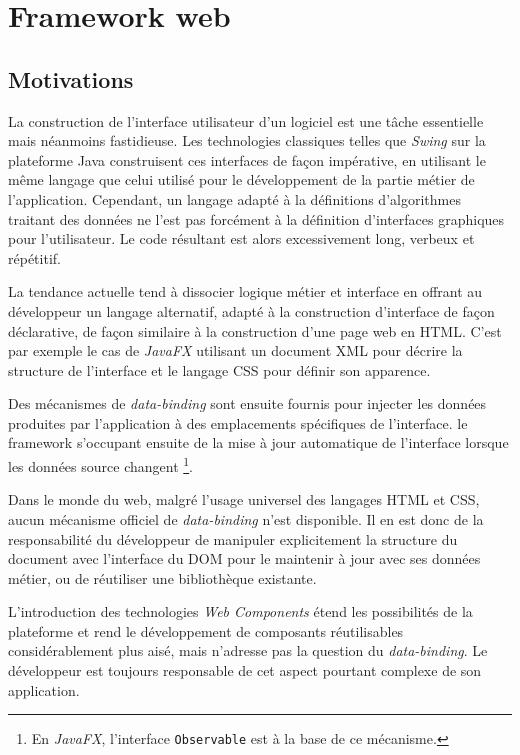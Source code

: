 \chapter{Framework web}

\section{Motivations}

La construction de l'interface utilisateur d'un logiciel est une tâche essentielle mais néanmoins fastidieuse. Les technologies classiques telles que \emph{Swing} sur la plateforme Java construisent ces interfaces de façon impérative, en utilisant le même langage que celui utilisé pour le développement de la partie métier de l'application. Cependant, un langage adapté à la définitions d'algorithmes traitant des données ne l'est pas forcément à la définition d'interfaces graphiques pour l'utilisateur. Le code résultant est alors excessivement long, verbeux et répétitif.

La tendance actuelle tend à dissocier logique métier et interface en offrant au développeur un langage alternatif, adapté à la construction d'interface de façon déclarative, de façon similaire à la construction d'une page web en HTML. C'est par exemple le cas de \emph{JavaFX} utilisant un document XML pour décrire la structure de l'interface et le langage CSS pour définir son apparence.

Des mécanismes de \emph{data-binding} sont ensuite fournis pour injecter les données produites par l'application à des emplacements spécifiques de l'interface. le framework s'occupant ensuite de la mise à jour automatique de l'interface lorsque les données source changent \footnote{En \emph{JavaFX}, l'interface \texttt{Observable} est à la base de ce mécanisme.}.

Dans le monde du web, malgré l'usage universel des langages HTML et CSS, aucun mécanisme officiel de \emph{data-binding} n'est disponible. Il en est donc de la responsabilité du développeur de manipuler explicitement la structure du document avec l'interface du DOM pour le maintenir à jour avec ses données métier, ou de réutiliser une bibliothèque existante.

L'introduction des technologies \emph{Web Components} étend les possibilités de la plateforme et rend le développement de composants réutilisables considérablement plus aisé, mais n'adresse pas la question du \emph{data-binding}. Le développeur est toujours responsable de cet aspect pourtant complexe de son application.

